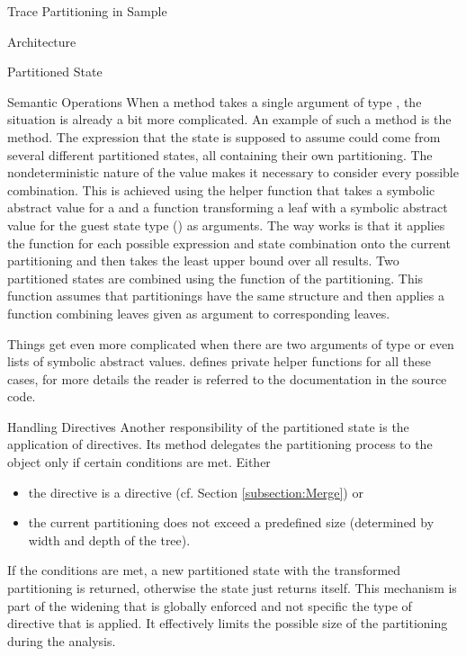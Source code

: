 \begin{chapter}{Trace Partitioning in Sample}
\begin{section}{Architecture}
\begin{subsection}{Partitioned State}
\begin{subsubsection}{Semantic Operations}
				When a method takes a single argument of type , the situation is already a bit more complicated. An example of such a method is the  method. The expression that the state is supposed to assume could come from several different partitioned states, all containing their own partitioning. The nondeterministic nature of the value makes it necessary to consider every possible combination. This is achieved using the helper function  that takes a symbolic abstract value for a  and a function transforming a leaf with a symbolic abstract value for the guest state type () as arguments. The way  works is that it applies the function for each possible expression and state combination onto the current partitioning and then takes the least upper bound over all results. Two partitioned states are combined using the  function of the partitioning. This function assumes that partitionings have the same structure and then applies a function combining leaves given as argument to corresponding leaves.

				Things get even more complicated when there are two arguments of type  or even lists of symbolic abstract values.  defines private helper functions for all these cases, for more details the reader is referred to the documentation in the source code.\\
			\end{subsubsection}


			\begin{subsubsection}{Handling Directives}
				Another responsibility of the partitioned state is the application of directives. Its  method delegates the partitioning process to the  object only if certain conditions are met. Either
				\begin{itemize}
					\item the directive is a  directive (cf. Section \ref{subsection:Merge}) or
					\item the current partitioning does not exceed a predefined size (determined by width and depth of the tree).
				\end{itemize}
				If the conditions are met, a new partitioned state with the transformed partitioning is returned, otherwise the state just returns itself. This mechanism is part of the widening that is globally enforced and not specific the type of directive that is applied. It effectively limits the possible size of the partitioning during the analysis.
			\end{subsubsection}
		\end{subsection}


\end{section}
\end{chapter}
